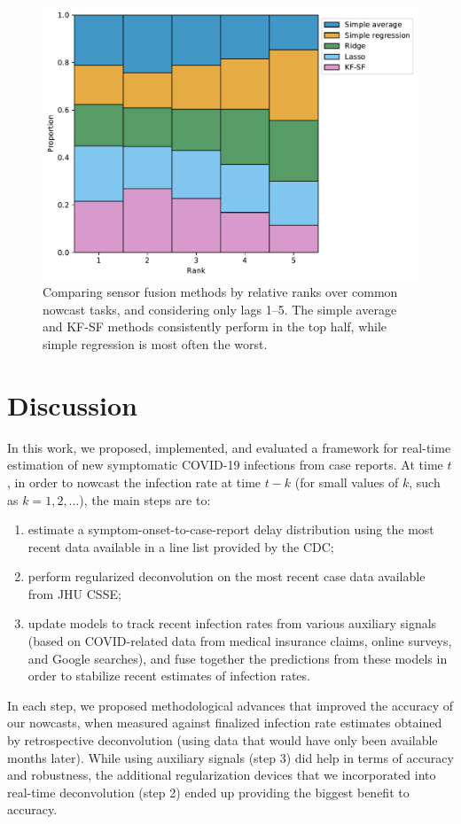 \documentclass[sts]{imsart}
\theoremstyle{plain}
\theoremstyle{definition}
\theoremstyle{remark}
\begin{document}
\begin{figure}[tb]
\centering
\includegraphics[width=0.95\linewidth]{./figures/rankplot_fusion_no_claims.pdf}
\caption{Comparing sensor fusion methods by relative ranks over common nowcast 
  tasks, and considering only lags 1--5. The simple average and KF-SF methods
  consistently perform in the top half, while simple regression is most often
  the worst.}
	\label{fig:rank_ensemble}
\end{figure}

\section{Discussion}
\label{sec:discussion}

In this work, we proposed, implemented, and evaluated a framework for real-time
estimation of new symptomatic COVID-19 infections from case reports. At time
$t$, in order to nowcast the infection rate at time $t-k$ (for small values of
$k$, such as $k=1,2,\ldots$), the main steps are to:  
\begin{enumerate}
\item estimate a symptom-onset-to-case-report delay distribution using the most 
  recent data available in a line list provided by the CDC;  
\item perform regularized deconvolution on the most recent case data available 
  from JHU CSSE; 
\item update models to track recent infection rates from various auxiliary
  signals (based on COVID-related data from medical insurance claims, online
  surveys, and Google searches), and fuse together the predictions from these
  models in order to stabilize recent estimates of infection rates. 
\end{enumerate}
In each step, we proposed methodological advances that improved the accuracy of
our nowcasts, when measured against finalized infection rate estimates obtained
by retrospective deconvolution (using data that would have only been available 
months later). While using auxiliary signals (step 3) did help in terms of
accuracy and robustness, the additional regularization devices that we
incorporated into real-time deconvolution (step 2) ended up providing the
biggest benefit to accuracy. 
\end{document}
